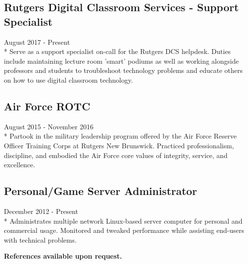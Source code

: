 \documentclass{article}
\begin{document}
\begin{multicols}{2}
\subsection{Rutgers Digital Classroom Services - Support Specialist}
August 2017 - Present\\*
Serve as a support specialist on-call for the Rutgers DCS helpdesk. Duties include maintaining lecture room 'smart' podiums as well as working alongside professors and students to troubleshoot technology problems and educate others on how to use digital classroom technology.

\subsection{Air Force ROTC}
August 2015 - November 2016\\*
Partook in the military leadership program offered by the Air Force Reserve Officer Training Corps at Rutgers New Brunswick. Practiced professionalism, discipline, and embodied the Air Force core values of integrity, service, and excellence.

\subsection{Personal/Game Server Administrator}
December 2012 - Present\\*
Administrates multiple network Linux-based server computer for personal and commercial usage. Monitored and tweaked performance while assisting end-users with technical problems.  

\end{multicols}

\begin{center}
\textbf{References available upon request.}
\end{center}
\end{document}
